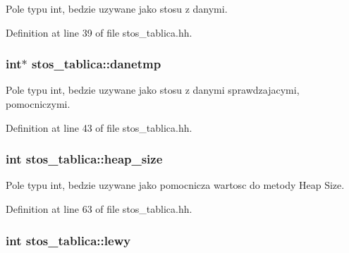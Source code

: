 Pole typu int, bedzie uzywane jako stosu z danymi. 



Definition at line 39 of file stos\-\_\-tablica.\-hh.

\hypertarget{classstos__tablica_a2ee83414df31c2f56383199a5d47c755}{
\subsubsection[{danetmp}]{\setlength{\rightskip}{0pt plus 5cm}int$\ast$ stos\-\_\-tablica\-::danetmp\hspace{0.3cm}{\ttfamily [private]}}}\label{classstos__tablica_a2ee83414df31c2f56383199a5d47c755}


Pole typu int, bedzie uzywane jako stosu z danymi sprawdzajacymi, pomocniczymi. 



Definition at line 43 of file stos\-\_\-tablica.\-hh.

\hypertarget{classstos__tablica_ae1737beb175c9041e44ff8b374fa3565}{
\subsubsection[{heap\-\_\-size}]{\setlength{\rightskip}{0pt plus 5cm}int stos\-\_\-tablica\-::heap\-\_\-size\hspace{0.3cm}{\ttfamily [private]}}}\label{classstos__tablica_ae1737beb175c9041e44ff8b374fa3565}


Pole typu int, bedzie uzywane jako pomocnicza wartosc do metody Heap Size. 



Definition at line 63 of file stos\-\_\-tablica.\-hh.

\hypertarget{classstos__tablica_addee4392050e497f2b9f07a5e7a17606}{
\subsubsection[{lewy}]{\setlength{\rightskip}{0pt plus 5cm}int stos\-\_\-tablica\-::lewy\hspace{0.3cm}{\ttfamily [private]}}}\label{classstos__tablica_addee4392050e497f2b9f07a5e7a17606}


